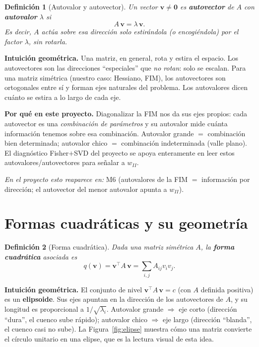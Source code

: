 \documentclass[11pt,a4paper]{article}
\newtheorem{definition}{Definición}
\newcommand{\transp}{^{\top}}
\begin{document}
\begin{definition}[Autovalor y autovector]
Un vector $\mathbf{v}\neq\bm0$ es \textbf{autovector} de $A$ con \textbf{autovalor} $\lambda$ si
\[
A\,\mathbf{v}=\lambda\,\mathbf{v}.
\]
Es decir, $A$ actúa sobre esa dirección solo estirándola (o encogiéndola) por el factor $\lambda$, sin rotarla.
\end{definition}

\textbf{Intuición geométrica.} Una matriz, en general, rota y estira el espacio. Los autovectores son las direcciones ``especiales'' que \emph{no rotan}: solo se escalan. Para una matriz simétrica (nuestro caso: Hessiano, FIM), los autovectores son ortogonales entre sí y forman ejes naturales del problema. Los autovalores dicen cuánto se estira a lo largo de cada eje.

\textbf{Por qué en este proyecto.} Diagonalizar la FIM nos da sus ejes propios: cada autovector es una \emph{combinación de parámetros} y su autovalor mide cuánta información tenemos sobre esa combinación. Autovalor grande $=$ combinación bien determinada; autovalor chico $=$ combinación indeterminada (valle plano). El diagnóstico Fisher$+$SVD del proyecto se apoya enteramente en leer estos autovalores/autovectores para señalar a $w_{II}$.

\emph{En el proyecto esto reaparece en:} M6 (autovalores de la FIM $=$ información por dirección; el autovector del menor autovalor apunta a $w_{II}$).

\section{Formas cuadráticas y su geometría}

\begin{definition}[Forma cuadrática]
Dada una matriz simétrica $A$, la \textbf{forma cuadrática} asociada es
\[
q(\mathbf{v})=\mathbf{v}\transp A\,\mathbf{v}=\sum_{i,j}A_{ij}v_i v_j .
\]
\end{definition}

\textbf{Intuición geométrica.} El conjunto de nivel $\mathbf{v}\transp A\,\mathbf{v}=c$ (con $A$ definida positiva) es un \textbf{elipsoide}. Sus ejes apuntan en la dirección de los autovectores de $A$, y su longitud es proporcional a $1/\sqrt{\lambda_i}$. Autovalor grande $\Rightarrow$ eje corto (dirección ``dura'', el cuenco sube rápido); autovalor chico $\Rightarrow$ eje largo (dirección ``blanda'', el cuenco casi no sube). La Figura~\ref{fig:elipse} muestra cómo una matriz convierte el círculo unitario en una elipse, que es la lectura visual de esta idea.
\end{document}
